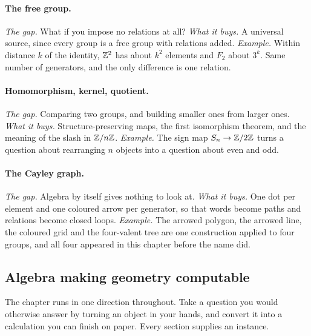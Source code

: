 \paragraph{The free group.} \emph{The gap.} What if you impose no relations at all? \emph{What it buys.} A universal source, since every group is a free group with relations added. \emph{Example.} Within distance $k$ of the identity, $\mathbb{Z}^2$ has about $k^2$ elements and $F_2$ about $3^k$. Same number of generators, and the only difference is one relation.

\paragraph{Homomorphism, kernel, quotient.} \emph{The gap.} Comparing two groups, and building smaller ones from larger ones. \emph{What it buys.} Structure-preserving maps, the first isomorphism theorem, and the meaning of the slash in $\mathbb{Z}/n\mathbb{Z}$. \emph{Example.} The sign map $S_n\to\mathbb{Z}/2\mathbb{Z}$ turns a question about rearranging $n$ objects into a question about even and odd.

\paragraph{The Cayley graph.} \emph{The gap.} Algebra by itself gives nothing to look at. \emph{What it buys.} One dot per element and one coloured arrow per generator, so that words become paths and relations become closed loops. \emph{Example.} The arrowed polygon, the arrowed line, the coloured grid and the four-valent tree are one construction applied to four groups, and all four appeared in this chapter before the name did.

\subsection{Algebra making geometry computable}

The chapter runs in one direction throughout. Take a question you would otherwise answer by turning an object in your hands, and convert it into a calculation you can finish on paper. Every section supplies an instance.

